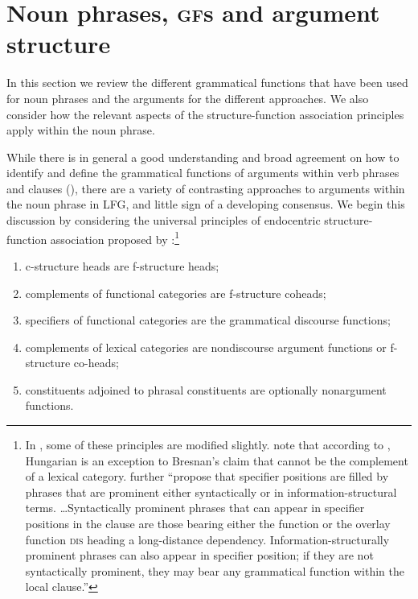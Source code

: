 \documentclass[output=paper,hidelinks]{langscibook}
\begin{document}
\section{Noun phrases, \textsc{gf}s and argument structure}\label{sec:nominal:NPgfs}


In this section we review the different grammatical functions that have been used for noun phrases and the arguments for the different approaches. We also consider how the relevant aspects of the structure-function association principles apply within the noun phrase.   

While there is in general a good understanding and broad agreement on how to identify and define the grammatical functions of arguments within verb phrases and clauses (), there are a variety of contrasting approaches to arguments within the noun phrase in LFG, and little sign of a developing consensus. We begin this discussion by considering the universal principles of endocentric structure-function association proposed by \citet[105, 117]{BresnanEtAl2016}:\footnote{In \citet{DLM:LFG}, some of these principles are modified slightly. \citeauthor{DLM:LFG} note that according to \citet{Laczko14}, Hungarian is an exception to Bresnan's claim that {\SUBJ} cannot be the complement of a lexical category. \citet[121]{DLM:LFG} further ``propose that specifier positions are filled by phrases that are prominent either syntactically or in information-structural terms. \ldots{}Syntactically prominent phrases that can appear in specifier positions in the clause are those bearing either the function {\SUBJ} or the overlay function \textsc{dis} heading a long-distance dependency. Information-structurally prominent phrases can also appear in specifier position; if they are not syntactically prominent, they may bear any grammatical function within the local clause.''}

\begin{enumerate}
	\item c-structure heads are f-structure heads;
	\item complements of functional categories are f-structure coheads;
	\item specifiers of functional categories are the grammatical discourse functions;
	\item complements of lexical categories are nondiscourse argument functions or f-structure co-heads;
	\item constituents adjoined to phrasal constituents are optionally nonargument functions. 
\end{enumerate}
\vspace{0.2 cm}
\end{document}
